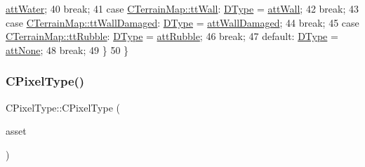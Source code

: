 \begin{DoxyCode}
      \hyperlink{classCPixelType_af06457fd1c2ff34c67ce670e633a10b0af69e96129a2b59b0d8f96fcfbe3dbecb}{attWater};
40                                             \textcolor{keywordflow}{break};
41         \textcolor{keywordflow}{case} \hyperlink{classCTerrainMap_aff2ab991e237269941416dd79d8871d4a9faa5ddca496d71c34b9d01157de34b2}{CTerrainMap::ttWall}:           \hyperlink{classCPixelType_aca37f042b510a349e0d3209c73ae51c5}{DType} = 
      \hyperlink{classCPixelType_af06457fd1c2ff34c67ce670e633a10b0a198a6c6c8db4050eff2367587125e0df}{attWall};
42                                             \textcolor{keywordflow}{break};
43         \textcolor{keywordflow}{case} \hyperlink{classCTerrainMap_aff2ab991e237269941416dd79d8871d4acbd754bea3ab1493a28f3a67596482dd}{CTerrainMap::ttWallDamaged}:    \hyperlink{classCPixelType_aca37f042b510a349e0d3209c73ae51c5}{DType} = 
      \hyperlink{classCPixelType_af06457fd1c2ff34c67ce670e633a10b0a919b133b55e3fefe3974cc257b8956b4}{attWallDamaged};
44                                             \textcolor{keywordflow}{break};
45         \textcolor{keywordflow}{case} \hyperlink{classCTerrainMap_aff2ab991e237269941416dd79d8871d4a0969ea4c56acb3f5acf137c0d06a3371}{CTerrainMap::ttRubble}:         \hyperlink{classCPixelType_aca37f042b510a349e0d3209c73ae51c5}{DType} = 
      \hyperlink{classCPixelType_af06457fd1c2ff34c67ce670e633a10b0a1f6b44411474ba3a5ad121702d9a4ba0}{attRubble};
46                                             \textcolor{keywordflow}{break};
47         \textcolor{keywordflow}{default}:                            \hyperlink{classCPixelType_aca37f042b510a349e0d3209c73ae51c5}{DType} = \hyperlink{classCPixelType_af06457fd1c2ff34c67ce670e633a10b0a19050fdb98082f54b7a4e9365912763b}{attNone};
48                                             \textcolor{keywordflow}{break};
49     \}
50 \}
\end{DoxyCode}
\hypertarget{classCPixelType_abf05fa378b6e924c40d3616d6c718557}{}\label{classCPixelType_abf05fa378b6e924c40d3616d6c718557} 
\subsubsection{\texorpdfstring{C\+Pixel\+Type()}{CPixelType()}\hspace{0.1cm}{\footnotesize\ttfamily [3/4]}}
{\footnotesize\ttfamily C\+Pixel\+Type\+::\+C\+Pixel\+Type (\begin{DoxyParamCaption}\item[{const \hyperlink{classCPlayerAsset}{C\+Player\+Asset} \&}]{asset }\end{DoxyParamCaption})}



